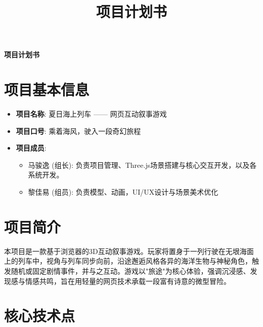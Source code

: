 \documentclass[a4paper, 12pt]{article}
\title{\bfseries 项目计划书}
\author{}
\date{}
\newcommand{\projectitem}[1]{\item \textbf{#1}:}
\begin{document}
\begin{center}
    {\Huge\bfseries 项目计划书}
    \vspace{1cm}
\end{center}

\section*{项目基本信息}

\begin{itemize}
    \projectitem{项目名称}
    夏日海上列车 —— 网页互动叙事游戏

    \projectitem{项目口号}
    乘着海风，驶入一段奇幻旅程

    \projectitem{项目成员}
    \begin{itemize}
        \item 马骏逸 (组长): 负责项目管理、Three.js场景搭建与核心交互开发，以及各系统开发。
        \item 黎佳易 (组员): 负责模型、动画，UI/UX设计与场景美术优化
    \end{itemize}
\end{itemize}

\section*{项目简介}

本项目是一款基于浏览器的3D互动叙事游戏。玩家将置身于一列行驶在无垠海面上的列车中，视角与列车同步向前，沿途邂逅风格各异的海洋生物与神秘角色，触发随机或固定剧情事件，并与之互动。游戏以"旅途"为核心体验，强调沉浸感、发现感与情感共鸣，旨在用轻量的网页技术承载一段富有诗意的微型冒险。

\section*{核心技术点}
\end{document}
